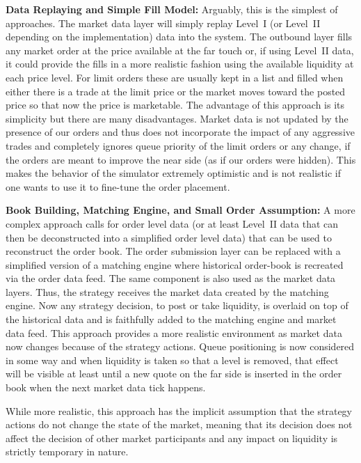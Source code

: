 \noindent\textbf{Data Replaying and Simple Fill Model:} Arguably, this is the simplest of approaches. The market data layer will simply replay Level~I (or Level~II depending on the implementation) data into the system. The outbound layer fills any market order at the price available at the far touch or, if using Level~II data, it could provide the fills in a more realistic fashion using the available liquidity at each price level. For limit orders these are usually kept in a list and filled when either there is a trade at the limit price or the market moves toward the posted price so that now the price is marketable. The advantage of this approach is its simplicity but there are many disadvantages. Market data is not updated by the presence of our orders and thus does not incorporate the impact of any aggressive trades and completely ignores queue priority of the limit orders or any change, if the orders are meant to improve the near side (as if our orders were hidden). This makes the behavior of the simulator extremely optimistic and is not realistic if one wants to use it to fine-tune the order placement. \twomedskip


\noindent\textbf{Book Building, Matching Engine, and Small Order Assumption:} A more complex approach calls for order level data (or at least Level~II data that can then be deconstructed into a simplified order level data) that can be used to reconstruct the order book. The order submission layer can be replaced with a simplified version of a matching engine where historical order-book is recreated via the order data feed. The same component is also used as the market data layers. Thus, the strategy receives the market data created by the matching engine. Now any strategy decision, to post or take liquidity, is overlaid on top of the historical data and is faithfully added to the matching engine and market data feed. This approach provides a more realistic environment as market data now changes because of the strategy actions. Queue positioning is now considered in some way and when liquidity is taken so that a level is removed, that effect will be visible at least until a new quote on the far side is inserted in the order book when the next market data tick happens.


While more realistic, this approach has the implicit assumption that the strategy actions do not change the state of the market, meaning that its decision does not affect the decision of other market participants and any impact on liquidity is strictly temporary in nature. \twomedskip


